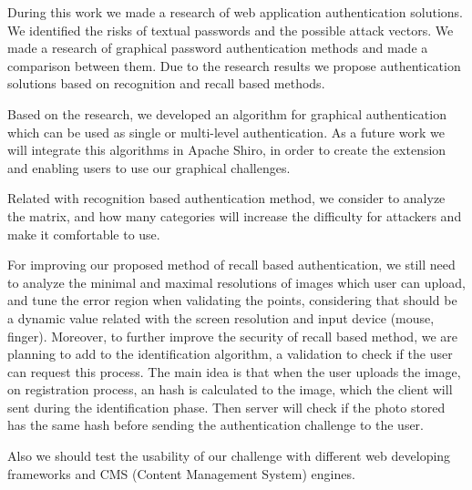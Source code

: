 During this work we made a research of web application authentication solutions. We identified the risks of textual passwords and the possible attack vectors. We made a research of graphical password authentication methods and made a comparison between them. Due to the research results we propose authentication solutions based on recognition and recall based methods.

Based on the research, we developed an algorithm for graphical authentication which can be used as single or multi-level authentication. As a future work we will integrate this algorithms in Apache Shiro, in order to create the extension and enabling users to use our graphical challenges.

Related with recognition based authentication method, we consider to analyze the matrix, and how many categories will increase the difficulty for attackers and make it comfortable to  use. 
 
For improving our proposed method of recall based authentication, we still need to analyze the minimal and maximal resolutions of images which user can upload, and tune the error region when validating the points, considering that should be a dynamic value related with the screen resolution and input device (mouse, finger). Moreover, to further improve the security of recall based method, we are planning to add to the identification algorithm, a validation to check if the user can request this process. The main idea is that when the user uploads the image, on registration process, an hash is calculated to the image, which the client will sent during the identification phase. Then server will check if the photo stored has the same hash before sending the authentication challenge to the user.

Also we should test the usability of our challenge with different web developing frameworks and CMS (Content Management System) engines.   

